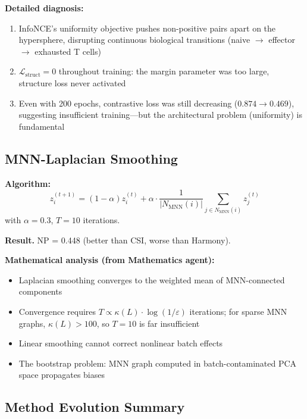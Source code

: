 \documentclass[10pt]{article}
\begin{document}
\textbf{Detailed diagnosis:}
\begin{enumerate}
\item InfoNCE's uniformity objective pushes non-positive pairs apart on the hypersphere, disrupting continuous biological transitions (naive $\to$ effector $\to$ exhausted T cells)
\item $\mathcal{L}_{\text{struct}} = 0$ throughout training: the margin parameter was too large, structure loss never activated
\item Even with 200 epochs, contrastive loss was still decreasing ($0.874 \to 0.469$), suggesting insufficient training---but the architectural problem (uniformity) is fundamental
\end{enumerate}

\subsection{MNN-Laplacian Smoothing}

\textbf{Algorithm:}
$$z_i^{(t+1)} = (1 - \alpha) z_i^{(t)} + \alpha \cdot \frac{1}{|N_{\text{MNN}}(i)|} \sum_{j \in N_{\text{MNN}}(i)} z_j^{(t)}$$
with $\alpha = 0.3$, $T = 10$ iterations.

\textbf{Result.} NP = 0.448 (better than CSI, worse than Harmony).

\textbf{Mathematical analysis (from Mathematics agent):}
\begin{itemize}
\item Laplacian smoothing converges to the weighted mean of MNN-connected components
\item Convergence requires $T \propto \kappa(L) \cdot \log(1/\varepsilon)$ iterations; for sparse MNN graphs, $\kappa(L) > 100$, so $T = 10$ is far insufficient
\item Linear smoothing cannot correct nonlinear batch effects
\item The bootstrap problem: MNN graph computed in batch-contaminated PCA space propagates biases
\end{itemize}

\subsection{Method Evolution Summary}
\end{document}
